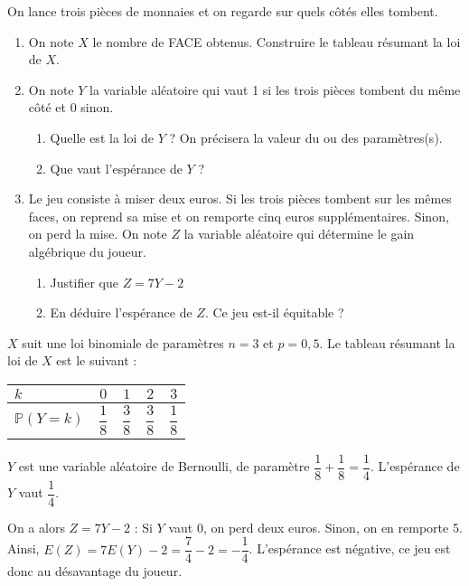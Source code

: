 \documentclass[11pt,fleqn, openany]{book} %
\begin{document}
\begin{exercise}

On lance trois pièces de monnaies et on regarde sur quels côtés elles tombent. 
\begin{enumerate}

\item On note $X$ le nombre de FACE obtenus. Construire le tableau résumant la loi de $X$.

\item On note $Y$ la variable aléatoire qui vaut 1 si les trois pièces tombent du même côté et 0 sinon. 
\begin{enumerate}
\item Quelle est la loi de $Y$ ? On précisera la valeur du ou des paramètres(s).
\item Que vaut l'espérance de $Y$ ?
\end{enumerate}
\item Le jeu consiste à miser deux euros. Si les trois pièces tombent sur les mêmes faces, on reprend sa mise et on remporte cinq euros supplémentaires. Sinon, on perd la mise. On note $Z$ la variable aléatoire qui détermine le gain algébrique du joueur.
\begin{enumerate}
\item Justifier que $Z=7Y-2$
\item En déduire l'espérance de $Z$. Ce jeu est-il équitable ?
\end{enumerate}
\end{enumerate}

\end{exercise}

\begin{solution}

$X$ suit une loi binomiale de paramètres $n=3$ et $p=0,5$. Le tableau résumant la loi de $X$ est le suivant :
\begin{center}
\begin{tabular}{|l|c|c|c|c|}
\hline
$k$ & $0$ & $1$ & $2$ & $3$ \\
\hline
$\mathbb{P}(Y=k)$ & $\dfrac{1}{8}$ & $\dfrac{3}{8}$ & $\dfrac{3}{8}$ & $\dfrac{1}{8}$ \\
\hline \end{tabular}\end{center}

$Y$ est une variable aléatoire de Bernoulli, de paramètre $\dfrac{1}{8}+\dfrac{1}{8}=\dfrac{1}{4}$. L'espérance de $Y$ vaut $\dfrac{1}{4}$.

On a alors $Z= 7Y-2$ : Si $Y$ vaut 0, on perd deux euros. Sinon, on en remporte 5. \\Ainsi, $E(Z)=7E(Y)-2=\dfrac{7}{4}-2=-\dfrac{1}{4}$. L'espérance est négative, ce jeu est donc au désavantage du joueur.
\end{solution}
\end{document}
